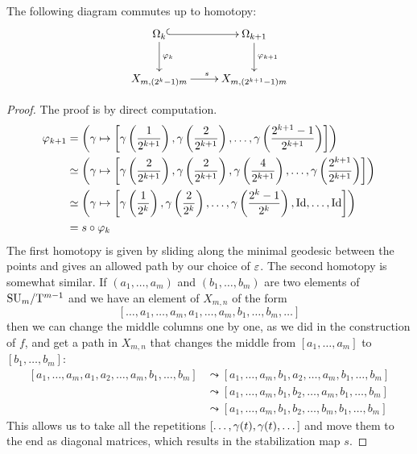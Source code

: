 \begin{lemma}
  \label{lem:com}
  The following diagram commutes up to homotopy:
  \[ \xymatrix{\Omega_k \ar@{^(->}[r] \ar[d]^{\varphi_k} & \Omega_{k+1}
  \ar[d]^{\varphi_{k+1}} \\
  X_{m,(2^k-1)m} \ar[r]^{s} & X_{m,(2^{k+1}-1)m} } \]
\end{lemma}
\begin{proof}
  The proof is by direct computation.
  \begin{align*}
    \varphi_{k+1} &= \left( \gamma \mapsto \left[
        \gamma\left(\frac{1}{2^{k+1}}\right),
        \gamma\left(\frac{2}{2^{k+1}}\right), \dots,
        \gamma\left(\frac{2^{k+1}-1}{2^{k+1}}\right) \right]\right) \\
    &\simeq \left(\gamma \mapsto \left[ \gamma\left(\frac{2}{2^{k+1}}\right),
      \gamma\left(\frac{2}{2^{k+1}}\right),
      \gamma\left(\frac{4}{2^{k+1}}\right), \dots,
      \gamma\left(\frac{2^{k+1}}{2^{k+1}}\right) \right]\right) \\
    &\simeq \left(\gamma\mapsto \left[ \gamma\left(\frac{1}{2^{k}}\right),
      \gamma\left(\frac{2}{2^{k}}\right), \dots,
      \gamma\left(\frac{2^k-1}{2^k}\right), \operatorname{Id},\dots,\operatorname{Id} \right] \right)\\
    &= s\circ \varphi_k
  \end{align*}
  The first homotopy is given by sliding along the minimal geodesic
  between the points and gives an allowed path by our choice of
  $\varepsilon$. The second homotopy is somewhat similar. If $(a_1,\dots,a_m)$
  and $(b_1,\dots,b_m)$ are two elements of $\mathrm{SU}_{m}/\mathrm{T}^{m-1}$ and we have an
  element of $X_{m,n}$ of the form
  \[ \left[ \dots, a_1,\dots,a_m,a_1,\dots,a_m,b_1,\dots,b_m,\dots
  \right]\]
  then we can change the middle columns one by one, as we did in
  the construction of $f$, and get a path in $X_{m,n}$ that changes
  the middle from $[a_1,\dots,a_m]$ to $[b_1,\dots,b_m]$:
  \begin{align*}
    \left[a_1,\dots,a_m,a_1,a_2,\dots,a_m,b_1,\dots,b_m \right] 
    &\leadsto
    \left[a_1,\dots,a_m,b_1,a_2,\dots,a_m,b_1,\dots,b_m\right] \\ 
    &\leadsto
    \left[a_1,\dots,a_m,b_1,b_2,\dots,a_m,b_1,\dots,b_m\right] \\  
    &\leadsto
    \left[a_1,\dots,a_m,b_1,b_2,\dots,b_m,b_1,\dots,b_m\right]  
  \end{align*}
  This allows us to take all the repetitions
  $\left[\dots,\gamma(t),\gamma(t),\dots\right]$ and move them to the end as
  diagonal matrices, which results in the stabilization map $s$.
\end{proof}


